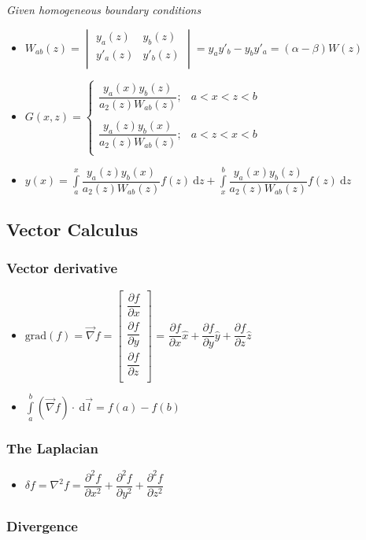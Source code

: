 \documentclass[]{report}
\newcommand \tab[1][1cm]{\hspace*{#1}}
\newcommand{\dn}[1]{\ \mathrm{d}#1}
\newcommand{\pp}[2]{\dfrac{\partial #1}{\partial #2}}
\newcommand{\itemt}{\item \tab}
\begin{document}
\textit{Given homogeneous boundary conditions}
\def \arraystretch{1.4}
\begin{itemize}
\itemt \( W_{ab}(z) = 
\begin{vmatrix}
y_a(z)	&	y_b(z)	\\
y'_a(z)	&	y'_b(z)	\\
\end{vmatrix} = y_a y'_b - y_b y'_a = (\alpha - \beta) W(z)  \)
\itemt \( G(x,z) = 
\begin{cases}
\dfrac{y_a(x)y_b(z)}{a_2(z)W_{ab}(z)};	& a<x<z<b \\
\\
\dfrac{y_a(z)y_b(x)}{a_2(z)W_{ab}(z)};	& a<z<x<b \\
\end{cases}\)
\itemt \( y(x) = \int\limits^x_a \dfrac{y_a(z)y_b(x)}{a_2(z)W_{ab}(z)} f(z) \dn z + \int\limits^b_x \dfrac{y_a(x)y_b(z)}{a_2(z)W_{ab}(z)} f(z) \dn z \)
\end{itemize}
        
\subsection{Vector Calculus}

\subsubsection{Vector derivative}
\begin{itemize}
\itemt \( \mathrm{grad} (f) = \vec{\nabla} f = 
\begin{bmatrix}
\pp{f}{x} 	\\
\pp{f}{y} 	\\
\pp{f}{z} 	\\
\end{bmatrix}
\) = \( \pp{f}{x} \hat{x} + \pp{f}{y} \hat{y} + \pp{f}{z} \hat{z}\)
\itemt \( \int\limits_a^b (\vec{\nabla}f)\cdot \dn \vec{l} = f(a) - f(b)\)
\end{itemize}

\subsubsection{The Laplacian}
\begin{itemize}
\itemt \( \delta f = \nabla^2 f = \pp{^2f}{x^2} + \pp{^2f}{y^2} + \pp{^2f}{z^2}\)
\end{itemize}

\subsubsection{Divergence}
\end{document}
